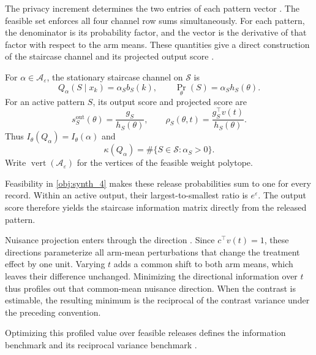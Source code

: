 The privacy increment  determines the two entries of each pattern vector . The feasible set  enforces all four channel row sums simultaneously. For each pattern, the denominator  is its probability factor, and the vector  is the derivative of that factor with respect to the arm means. These quantities give a direct construction of the staircase channel  and its projected output score .

For \(\alpha\in\mathcal A_\varepsilon\), the stationary staircase channel on \(\mathcal S\) is
\[
Q_\alpha(S\mid x_k)=\alpha_S b_S(k),
\qquad
\Pr_\theta(S)=\alpha_S h_S(\theta).
\]
For an active pattern \(S\), its output score and projected score are
\[
s_S^{\mathrm{out}}(\theta)=\frac{g_S}{h_S(\theta)},
\qquad
\rho_S(\theta,t)=\frac{g_S^\top v(t)}{h_S(\theta)}.
\]
Thus \(I_\theta(Q_\alpha)=I_\theta(\alpha)\) and
\[
\kappa(Q_\alpha)=\#\{S\in\mathcal S:\alpha_S>0\}.
\]
Write \(\operatorname{vert}(\mathcal A_\varepsilon)\) for the vertices of the feasible weight polytope.

Feasibility in \cref{obj:synth_4} makes these release probabilities sum to one for every record. Within an active output, their largest-to-smallest ratio is \(e^\varepsilon\). The output score  therefore yields the staircase information matrix  directly from the released pattern.

Nuisance projection enters through the direction . Since \(c^\top v(t)=1\), these directions parameterize all arm-mean perturbations that change the treatment effect by one unit. Varying \(t\) adds a common shift to both arm means, which leaves their difference unchanged. Minimizing the directional information  over \(t\) thus profiles out that common-mean nuisance direction. When the contrast is estimable, the resulting minimum is the reciprocal of the contrast variance under the preceding convention.

Optimizing this profiled value over feasible releases defines the information benchmark  and its reciprocal variance benchmark .

